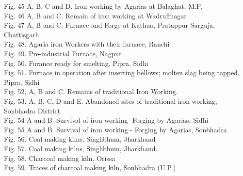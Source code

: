 \begin{myquote}
Fig. 45 A, B, C and D.  Iron working by Agarias at Balaghat, M.P.\\[.2cm]
Fig. 46 A, B and C.  Remain of iron working at Wadruffnagar \\[.2cm]
Fig. 47 A, B and C.   Furnace and Forge at Kathua, Pratappur Sarguja, Chattisgarh \\[.2cm]
Fig. 48.  Agaria iron Workers with their furnace, Ranchi\\[.2cm]
Fig. 49.   Pre-industrial Furnace, Nagpur \\[.2cm]
Fig. 50.  Furance ready for smelting, Pipra, Sidhi\\[.2cm]
Fig. 51.  Furnace in operation after inserting bellows; molten slag being tapped, Pipra, Sidhi \\[.2cm]
Fig. 52, A, B and C.  Remains of traditional Iron Working. \\[.2cm]
Fig. 53. A, B, C, D and E.  Abandoned sites of traditional iron working, Sonbhadra District\\[.2cm]
Fig. 54 A and B.  Survival of iron working- Forging by Agarias, Sidhi \\[.2cm]
Fig. 55 A and B.  Survival of iron working - Forging by Agarias, Sonbhadra \\[.2cm]
Fig. 56.  Coal making kilns, Singhbhum, Jharkhand\\[.2cm]
Fig. 57.   Coal making kilns, Singhbhum, Jharkhand.\\[.2cm]
Fig. 58.  Charcoal making kiln, Orissa\\[.2cm]
Fig. 59.  Traces of charcoal making kiln, Sonbhadra (U.P.)\\[.2cm]
\end{myquote}

